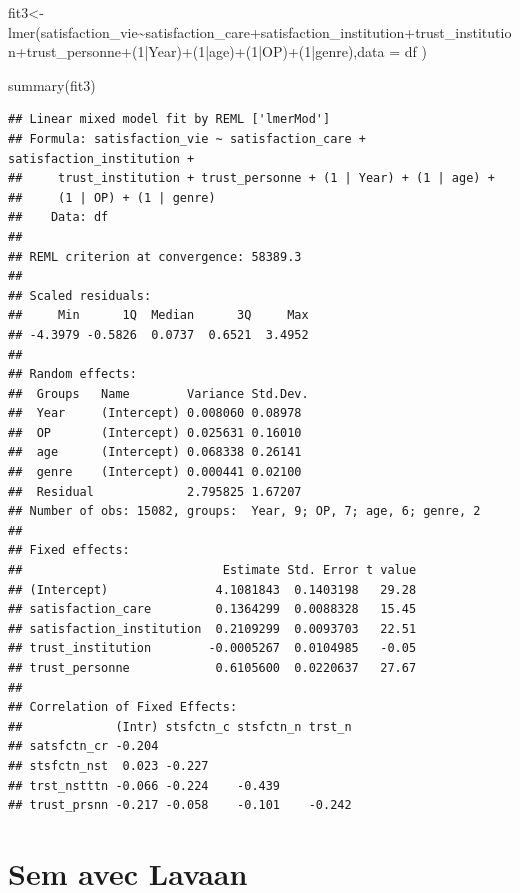 \documentclass[
]{book}
\newenvironment{Shaded}{\begin{snugshade}}{\end{snugshade}}
\newcommand{\AttributeTok}[1]{\textcolor[rgb]{0.77,0.63,0.00}{#1}}
\newcommand{\DecValTok}[1]{\textcolor[rgb]{0.00,0.00,0.81}{#1}}
\newcommand{\FunctionTok}[1]{\textcolor[rgb]{0.00,0.00,0.00}{#1}}
\newcommand{\NormalTok}[1]{#1}
\newcommand{\OtherTok}[1]{\textcolor[rgb]{0.56,0.35,0.01}{#1}}
\newcommand{\SpecialCharTok}[1]{\textcolor[rgb]{0.00,0.00,0.00}{#1}}
\begin{document}
\begin{Shaded}
\begin{Highlighting}[]
\NormalTok{fit3}\OtherTok{\textless{}{-}}\FunctionTok{lmer}\NormalTok{(satisfaction\_vie}\SpecialCharTok{\textasciitilde{}}\NormalTok{satisfaction\_care}\SpecialCharTok{+}\NormalTok{satisfaction\_institution}\SpecialCharTok{+}\NormalTok{trust\_institution}\SpecialCharTok{+}\NormalTok{trust\_personne}\SpecialCharTok{+}\NormalTok{(}\DecValTok{1}\SpecialCharTok{|}\NormalTok{Year)}\SpecialCharTok{+}\NormalTok{(}\DecValTok{1}\SpecialCharTok{|}\NormalTok{age)}\SpecialCharTok{+}\NormalTok{(}\DecValTok{1}\SpecialCharTok{|}\NormalTok{OP)}\SpecialCharTok{+}\NormalTok{(}\DecValTok{1}\SpecialCharTok{|}\NormalTok{genre),}\AttributeTok{data =}\NormalTok{ df )}

\FunctionTok{summary}\NormalTok{(fit3)}
\end{Highlighting}
\end{Shaded}

\begin{verbatim}
## Linear mixed model fit by REML ['lmerMod']
## Formula: satisfaction_vie ~ satisfaction_care + satisfaction_institution +  
##     trust_institution + trust_personne + (1 | Year) + (1 | age) +  
##     (1 | OP) + (1 | genre)
##    Data: df
## 
## REML criterion at convergence: 58389.3
## 
## Scaled residuals: 
##     Min      1Q  Median      3Q     Max 
## -4.3979 -0.5826  0.0737  0.6521  3.4952 
## 
## Random effects:
##  Groups   Name        Variance Std.Dev.
##  Year     (Intercept) 0.008060 0.08978 
##  OP       (Intercept) 0.025631 0.16010 
##  age      (Intercept) 0.068338 0.26141 
##  genre    (Intercept) 0.000441 0.02100 
##  Residual             2.795825 1.67207 
## Number of obs: 15082, groups:  Year, 9; OP, 7; age, 6; genre, 2
## 
## Fixed effects:
##                            Estimate Std. Error t value
## (Intercept)               4.1081843  0.1403198   29.28
## satisfaction_care         0.1364299  0.0088328   15.45
## satisfaction_institution  0.2109299  0.0093703   22.51
## trust_institution        -0.0005267  0.0104985   -0.05
## trust_personne            0.6105600  0.0220637   27.67
## 
## Correlation of Fixed Effects:
##             (Intr) stsfctn_c stsfctn_n trst_n
## satsfctn_cr -0.204                           
## stsfctn_nst  0.023 -0.227                    
## trst_nstttn -0.066 -0.224    -0.439          
## trust_prsnn -0.217 -0.058    -0.101    -0.242
\end{verbatim}

\hypertarget{sem-avec-lavaan}{%
\section{Sem avec Lavaan}\label{sem-avec-lavaan}}
\end{document}
